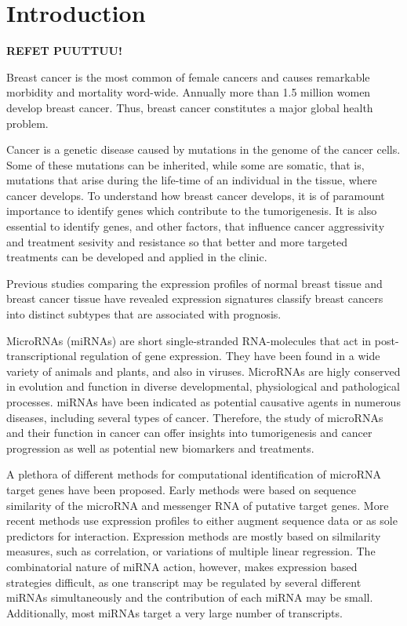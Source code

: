 
\section{Introduction}
\thispagestyle{empty}

\textbf{REFET PUUTTUU!}

Breast cancer is the most common of female cancers and causes remarkable
morbidity and mortality word-wide. Annually more than 1.5 million women
develop breast cancer. Thus, breast cancer constitutes a major global health
problem.

Cancer is a genetic disease caused by mutations in the genome of the cancer
cells. Some of these mutations can be inherited, while some are somatic, that
is, mutations that arise during the life-time of an individual in the tissue,
where cancer develops. To understand how breast cancer develops,
it is of paramount importance to identify genes which
contribute to the tumorigenesis. It is also essential to identify
genes, and other factors, that influence cancer aggressivity and
treatment sesivity and resistance so that better and more targeted
treatments can be developed and applied in the clinic.

Previous studies comparing the expression profiles of normal breast tissue
and breast cancer tissue have revealed expression signatures
classify breast cancers into distinct subtypes that are associated with prognosis.

MicroRNAs (miRNAs) are short single-stranded RNA-molecules that act in
post-transcriptional regulation of gene expression. They have been found in a
wide variety of animals and plants, and also in viruses. MicroRNAs are higly
conserved in evolution and function in diverse developmental, physiological
and pathological processes. miRNAs have been indicated as potential
causative agents in numerous diseases, including several types of cancer.
Therefore, the study of microRNAs and their function in cancer can offer
insights into tumorigenesis and cancer progression as well as potential new
biomarkers and treatments.

A plethora of different methods for computational identification of microRNA
target genes have been proposed. Early methods were based on sequence
similarity of the microRNA and messenger RNA of putative target genes. More
recent methods use expression profiles to either augment sequence data or as
sole predictors for interaction. Expression methods are mostly based on
silmilarity measures, such as correlation, or variations of multiple
linear regression. The combinatorial nature of miRNA action, however, makes
expression based strategies difficult, as one transcript may be regulated by
several different miRNAs simultaneously and the contribution of each miRNA may
be small. Additionally, most miRNAs target a very large number of transcripts.

